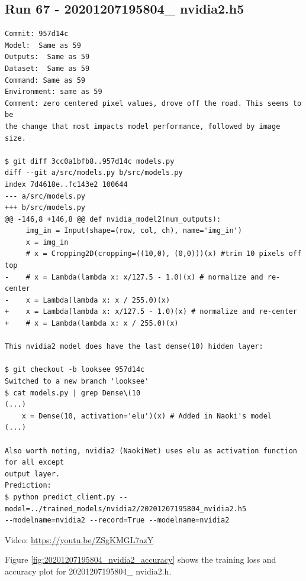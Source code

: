 \subsection{Run 67 - 20201207195804\_ nvidia2.h5}
\label{app_res:67}
\begin{verbatim}
Commit: 957d14c
Model:  Same as 59
Outputs:  Same as 59
Dataset:  Same as 59
Command: Same as 59
Environment: same as 59 
Comment: zero centered pixel values, drove off the road. This seems to be
the change that most impacts model performance, followed by image size.

$ git diff 3cc0a1bfb8..957d14c models.py
diff --git a/src/models.py b/src/models.py
index 7d4618e..fc143e2 100644
--- a/src/models.py
+++ b/src/models.py
@@ -146,8 +146,8 @@ def nvidia_model2(num_outputs):
     img_in = Input(shape=(row, col, ch), name='img_in')
     x = img_in
     # x = Cropping2D(cropping=((10,0), (0,0)))(x) #trim 10 pixels off top
-    # x = Lambda(lambda x: x/127.5 - 1.0)(x) # normalize and re-center
-    x = Lambda(lambda x: x / 255.0)(x)
+    x = Lambda(lambda x: x/127.5 - 1.0)(x) # normalize and re-center
+    # x = Lambda(lambda x: x / 255.0)(x)

This nvidia2 model does have the last dense(10) hidden layer:

$ git checkout -b looksee 957d14c
Switched to a new branch 'looksee'
$ cat models.py | grep Dense\(10
(...)
    x = Dense(10, activation='elu')(x) # Added in Naoki's model
(...)

Also worth noting, nvidia2 (NaokiNet) uses elu as activation function for all except
output layer.
Prediction:
$ python predict_client.py --model=../trained_models/nvidia2/20201207195804_nvidia2.h5
--modelname=nvidia2 --record=True --modelname=nvidia2

\end{verbatim}
Video: \url{https://youtu.be/ZSgKMGL7azY}

Figure \ref{fig:20201207195804_nvidia2_accuracy} 
shows the training loss and accuracy plot for 20201207195804\_ nvidia2.h.

